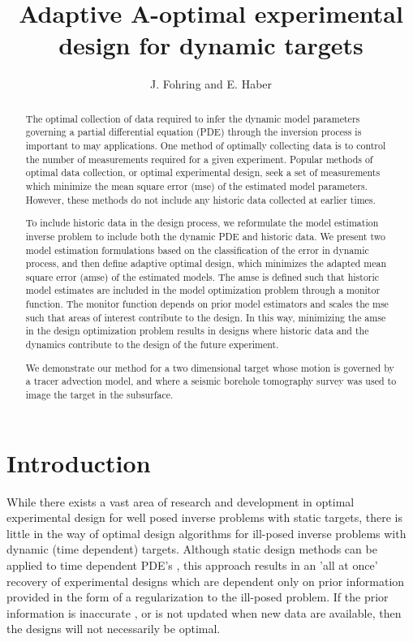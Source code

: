 \documentclass[11pt]{article}
\begin{document}
\title{ Adaptive A-optimal experimental design for dynamic targets}
\author{J. Fohring and E. Haber }
\maketitle


\begin{abstract}
The optimal collection of data required to infer the dynamic model parameters governing a partial differential equation (PDE) through the inversion process is important to may applications. 
One method of optimally collecting data is to control the number of measurements required for a given experiment. Popular methods of optimal data collection, or optimal experimental design, seek a set of measurements which minimize the mean square error (mse)  of the estimated model parameters. However, these methods do not include any historic data collected at earlier times. 

 To include historic data in the design process, we reformulate the model estimation inverse problem to include both the dynamic PDE and historic data. We present two model estimation formulations based on the classification of the error in dynamic process, and then define  adaptive optimal design, which minimizes the adapted  mean square error (amse) of the estimated models. The amse is defined such that historic model estimates are included in the model optimization problem through a monitor function. The monitor function depends on prior model estimators and scales the mse such that areas of interest  contribute  to the design. In this way, minimizing the amse in the design optimization problem results in designs where historic  data and the dynamics contribute to the design of the future experiment.

We demonstrate our method for a two dimensional target whose motion is governed by a tracer advection model, and where a seismic borehole tomography survey was used to image the target in the subsurface.  
 


\end{abstract}


\section{Introduction}
 While there exists a vast area of research and development in optimal experimental design for well posed inverse problems with static targets, there is little in the way of optimal design algorithms for ill-posed inverse problems with dynamic (time dependent) targets. Although static design methods can be applied to time dependent PDE's \cite{Alexanderian2014}, this approach results in an 'all at once' recovery of experimental designs which are dependent only on prior information provided in the form of a regularization to the ill-posed problem. If the prior information is inaccurate , or is not updated when new data are available, then the designs will not necessarily be optimal. 
 
\end{document}
